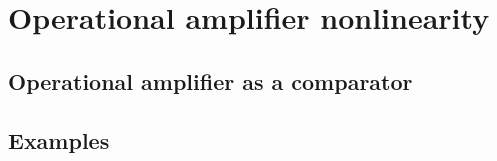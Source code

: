 \documentclass[../main.tex]{subfiles}
\begin{document}
\clearpage
\thispagestyle{empty}
\vspace*{7cm}
\section{Operational amplifier nonlinearity}
\vspace*{1.5cm}




\subsection{Operational amplifier as a comparator}

\subsection{Examples}
\end{document}

